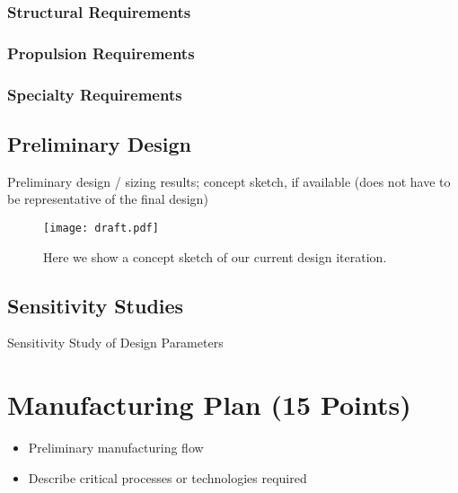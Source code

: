 \documentclass[proposal]{byu-aero}
\begin{document}
\subsubsection{Structural Requirements}
\label{sssec:structreqs}

\subsubsection{Propulsion Requirements}
\label{sssec:propreqs}

\subsubsection{Specialty Requirements} %
\label{sssec:specialreqs}

\subsection{Preliminary Design}
\label{ssec:preliminarydesign}

Preliminary design / sizing results; concept sketch, if available (does not have to be representative of the final design) 

\begin{figure}[h!]
	\centering
	\texttt{[image: draft.pdf]}
	\caption{Here we show a concept sketch of our current design iteration.}
	\label{fig:conceptsketch}
\end{figure}

\subsection{Sensitivity Studies}
\label{ssec:sensitivitystudies}

Sensitivity Study of Design Parameters

\section{Manufacturing Plan (15 Points)}
\label{sec:ManufacturingPlan}
\begin{itemize}
    \item Preliminary manufacturing flow
    \item Describe critical processes or technologies required
\end{itemize}
\end{document}
